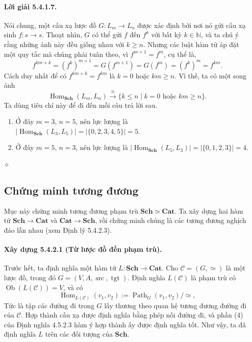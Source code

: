 \paragraph{Lời giải 5.4.1.7.} Nói chung, một cấu xạ lược đồ $G:L_m\to L_n$ được xác định bởi nơi nó gửi cấu xạ sinh $f:s\to s$. Thoạt nhìn, $G$ có thể gửi $f$ đến $f^k$ với bất kỳ $k\in\mathbb N$, và ta chú ý rằng những ảnh này đều giống nhau với $k\geq n$. Nhưng các luật hàm tử áp đặt một quy tắc mà chúng phải tuân theo, vì $f^{m+1}=f^m$, cụ thể là,
\[f^{km+k}=(f^k)^{m+1}=G(f^{m+1})=G(f^m)=(f^k)^m=f^{km}.\]
Cách duy nhất để có $f^{km+k}=f^{km}$ là $k=0$ hoặc $km\geq n$. Vì thế, ta có một song ánh
\[\operatorname{Hom}_{\mathbf{Sch}}(L_m,L_n)\xrightarrow{\cong}\{k\leq n\mid k=0\text{ hoặc }km\geq n\}.\]
Ta dùng tiêu chí này để đi đến mỗi câu trả lời sau.
\begin{enumerate}[label=\alph*.]
\item Ở đây $m=3$, $n=5$, nên lực lượng là $|\operatorname{Hom}_{\mathbf{Sch}}(L_3,L_5)|=|\{0,2,3,4,5\}|=5$.
\item Ở đây $m=5$, $n=3$, nên lực lượng là $|\operatorname{Hom}_{\mathbf{Sch}}(L_5,L_3)|=|\{0,1,2,3\}|=4$.
\end{enumerate}\hfill$\diamond$
\subsection{Chứng minh tương đương}
Mục này chứng minh tương đương phạm trù $\mathbf{Sch}\simeq\mathbf{Cat}$. Ta xây dựng hai hàm tử $\mathbf{Sch}\to\mathbf{Cat}$ và $\mathbf{Cat}\to\mathbf{Sch}$, rồi chứng minh chúng là các tương đương nghịch đảo lẫn nhau (xem Định lý 5.4.2.3).
\paragraph{Xây dựng 5.4.2.1 (Từ lược đồ đến phạm trù).} Trước hết, ta định nghĩa một hàm tử $L:\mathbf{Sch}\to\mathbf{Cat}$. Cho $\mathcal C=(G,\simeq)$ là một lược đồ, trong đó $G=(V,A,\operatorname{src},\operatorname{tgt})$. Định nghĩa $L(\mathcal C)$ là phạm trù có $\operatorname{Ob}(L(\mathcal C))=V$, và có
\[\operatorname{Hom}_{L(\mathcal C)}(v_1,v_2):=\operatorname{Path}_G(v_1,v_2)/\simeq,\]
Tức là tập các đường đi trong $G$ lấy thương theo quan hệ tương đương đường đi của $\mathcal C$. Hợp thành cấu xạ được định nghĩa bằng phép nối đường đi, và phần (4) của Định nghĩa 4.5.2.3 hàm ý hợp thành ấy được định nghĩa tốt. Như vậy, ta đã định nghĩa $L$ trên các đối tượng của $\mathbf{Sch}$.

